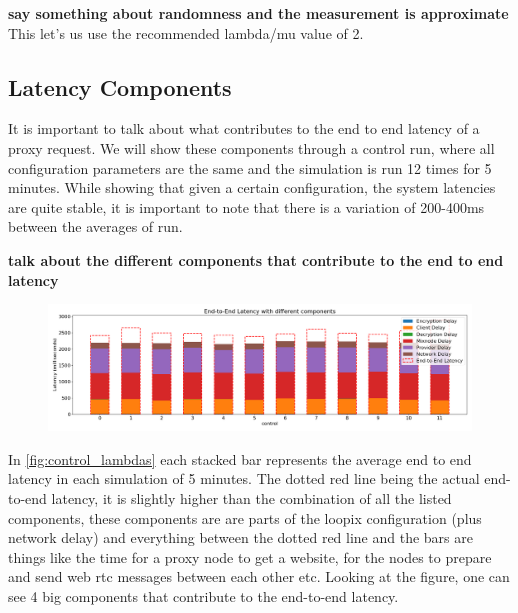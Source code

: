 \documentclass[a4paper,11pt,oneside]{report}
\begin{document}
\textbf{say something about randomness and the measurement is approximate}
This let's us use the recommended lambda/mu value of 2.

\subsection{Latency Components}
It is important to talk about what contributes to the end to end latency of a proxy request. We will show these components through a control run, where all configuration parameters are the same and the simulation is run 12 times for 5 minutes. While showing that given a certain configuration, the system latencies are quite stable, it is important to note that there is a variation of 200-400ms between the averages of run. 

\textbf{talk about the different components that contribute to the end to end latency}

\begin{figure}[htbp]
    \centering
    \includegraphics[width=\textwidth]{plots/control_latency_components.png}
    \caption{}
    \label{fig:control_lambdas}
\end{figure}

In \autoref{fig:control_lambdas} each stacked bar represents the average end to end latency in each simulation of 5 minutes. The dotted red line being the actual end-to-end latency, it is slightly higher than the combination of all the listed components, these components are are parts of the loopix configuration (plus network delay) and everything between the dotted red line and the bars are things like the time for a proxy node to get a website, for the nodes to prepare and send web rtc messages between each other etc. Looking at the figure, one can see 4 big components that contribute to the end-to-end latency.
\end{document}
